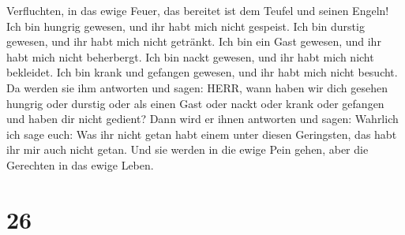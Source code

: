 Verfluchten, in das ewige Feuer, das bereitet ist dem Teufel und seinen
Engeln!  Ich bin hungrig gewesen, und ihr habt mich nicht
gespeist. Ich bin durstig gewesen, und ihr habt mich nicht getränkt.
 Ich bin ein Gast gewesen, und ihr habt mich nicht
beherbergt. Ich bin nackt gewesen, und ihr habt mich nicht bekleidet.
Ich bin krank und gefangen gewesen, und ihr habt mich nicht besucht.
 Da werden sie ihm antworten und sagen: HERR, wann haben
wir dich gesehen hungrig oder durstig oder als einen Gast oder nackt
oder krank oder gefangen und haben dir nicht gedient?  Dann
wird er ihnen antworten und sagen: Wahrlich ich sage euch: Was ihr nicht
getan habt einem unter diesen Geringsten, das habt ihr mir auch nicht
getan.  Und sie werden in die ewige Pein gehen, aber die
Gerechten in das ewige Leben.

\hypertarget{section-25}{%
\section{26}\label{section-25}}

